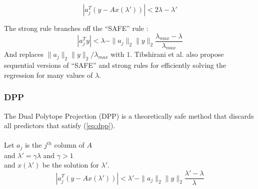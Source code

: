 \documentclass{article}
\begin{document}
\begin{equation} \label{eq:strong}
|a_j^T (y - Ax(\lambda'))| < 2\lambda - \lambda'
\end{equation}

The strong rule branches off the ``SAFE'' rule \cite{safe}:
$$ |a_j^T y| < \lambda - \|a_j\|_2 \|y\|_2 \frac{\lambda_{max}-\lambda}{\lambda_{max}} $$
And replaces $\|a_j\|_2 \|y\|_2/\lambda_{max}$ with $1$. Tibshirani et al. also propose sequential versions of ``SAFE'' and strong rules for efficiently solving the regression for many values of $\lambda$.

\subsubsection*{DPP}

The Dual Polytope Projection (DPP) \cite{ddp} is a theoretically safe method that discards all predictors that satisfy (\ref{eq:dpp}).\\
\\
Let $a_j$ is the $j^{th}$ column of $A$ \\
and $\lambda' = \gamma \lambda$ and $\gamma > 1$ \\ 
and $x(\lambda')$ be the solution for $\lambda'$.\\

\begin{equation} \label{eq:dpp}
|a_j^T (y - Ax(\lambda'))| < \lambda' - \|a_j\|_2 \|y\|_2 \frac{\lambda'-\lambda}{\lambda}
\end{equation}
\end{document}
